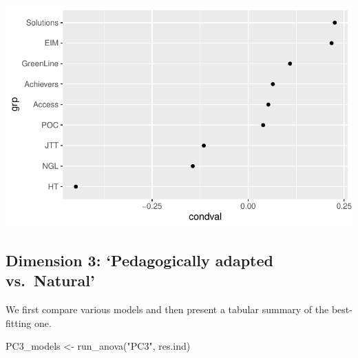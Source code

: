 \documentclass[
  letterpaper,
  DIV=11,
  numbers=noendperiod]{scrreprt}
\newenvironment{Shaded}{\begin{snugshade}}{\end{snugshade}}
\newcommand{\AttributeTok}[1]{\textcolor[rgb]{0.40,0.45,0.13}{#1}}
\newcommand{\CommentTok}[1]{\textcolor[rgb]{0.37,0.37,0.37}{#1}}
\newcommand{\FunctionTok}[1]{\textcolor[rgb]{0.28,0.35,0.67}{#1}}
\newcommand{\NormalTok}[1]{\textcolor[rgb]{0.00,0.23,0.31}{#1}}
\newcommand{\OtherTok}[1]{\textcolor[rgb]{0.00,0.23,0.31}{#1}}
\newcommand{\SpecialCharTok}[1]{\textcolor[rgb]{0.37,0.37,0.37}{#1}}
\newcommand{\StringTok}[1]{\textcolor[rgb]{0.13,0.47,0.30}{#1}}
\begin{document}
\begin{Shaded}
\end{Shaded}

\includegraphics{AppendixH_files/figure-pdf/unnamed-chunk-14-2.pdf}

\subsection{Dimension 3: `Pedagogically adapted
vs.~Natural'}\label{dimension-3-pedagogically-adapted-vs.-natural}

We first compare various models and then present a tabular summary of
the best-fitting one.

\begin{Shaded}
\begin{Highlighting}[]
\NormalTok{PC3\_models }\OtherTok{\textless{}{-}} \FunctionTok{run\_anova}\NormalTok{(}\StringTok{"PC3"}\NormalTok{, res.ind)}
\end{Highlighting}
\end{Shaded}
\end{document}
